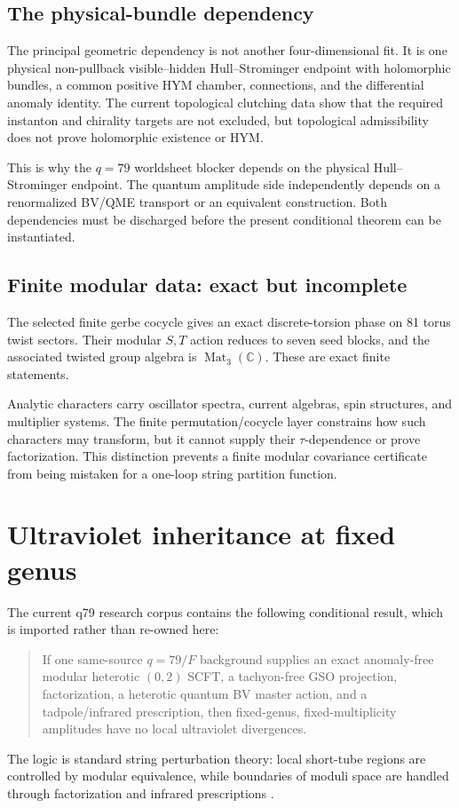 \documentclass[11pt]{article}
\theoremstyle{definition}
\theoremstyle{remark}
\begin{document}
\subsection{The physical-bundle dependency}

The principal geometric dependency is not another four-dimensional fit.  It
is one physical non-pullback visible--hidden Hull--Strominger endpoint with
holomorphic bundles, a common positive HYM chamber, connections, and the
differential anomaly identity.  The current topological clutching data show
that the required instanton and chirality targets are not excluded, but
topological admissibility does not prove holomorphic existence or HYM.

This is why the \(q=79\) worldsheet blocker depends on the physical
Hull--Strominger endpoint.  The quantum amplitude side independently depends
on a renormalized BV/QME transport or an equivalent construction.  Both
dependencies must be discharged before the present conditional theorem can
be instantiated.

\subsection{Finite modular data: exact but incomplete}

The selected finite gerbe cocycle gives an exact discrete-torsion phase on 81
torus twist sectors.  Their modular \(S,T\) action reduces to seven seed
blocks, and the associated twisted group algebra is
\(\operatorname{Mat}_3(\mathbb C)\).  These are exact finite statements.

Analytic characters carry oscillator spectra, current algebras, spin
structures, and multiplier systems.  The finite permutation/cocycle layer
constrains how such characters may transform, but it cannot supply their
\(\tau\)-dependence or prove factorization.  This distinction prevents a
finite modular covariance certificate from being mistaken for a one-loop
string partition function.

\section{Ultraviolet inheritance at fixed genus}
\label{sec:uv}

The current q79 research corpus contains the following conditional result,
which is imported rather than re-owned here:
\begin{quote}
If one same-source \(q=79/F\) background supplies an exact anomaly-free
modular heterotic \((0,2)\) SCFT, a tachyon-free GSO projection,
factorization, a heterotic quantum BV master action, and a tadpole/infrared
prescription, then fixed-genus, fixed-multiplicity amplitudes have no local
ultraviolet divergences.
\end{quote}
The logic is standard string perturbation theory: local short-tube regions
are controlled by modular equivalence, while boundaries of moduli space are
handled through factorization and infrared prescriptions
\cite{Witten2012,SenBV2015,SenUVIR2016}.
\end{document}
